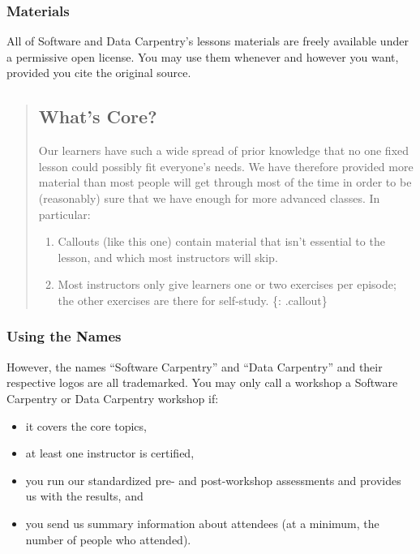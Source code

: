 \subsubsection{Materials}\label{materials}

All of Software and Data Carpentry's lessons materials are freely
available under a permissive open license. You may use
them whenever and however you want, provided you cite the original
source.

\begin{quote}
\subsection{What's Core?}\label{whats-core}

Our learners have such a wide spread of prior knowledge that no one
fixed lesson could possibly fit everyone's needs. We have therefore
provided more material than most people will get through most of the
time in order to be (reasonably) sure that we have enough for more
advanced classes. In particular:

\begin{enumerate}
\def\labelenumi{\arabic{enumi}.}
\itemsep1pt\parskip0pt
\item
  Callouts (like this one) contain material that isn't essential to the
  lesson, and which most instructors will skip.
\item
  Most instructors only give learners one or two exercises per episode;
  the other exercises are there for self-study. \{: .callout\}
\end{enumerate}
\end{quote}

\subsubsection{Using the Names}\label{using-the-names}

However, the names ``Software Carpentry'' and ``Data Carpentry'' and
their respective logos are all trademarked. You may only call a workshop
a Software Carpentry or Data Carpentry workshop if:

\begin{itemize}
\itemsep1pt\parskip0pt
\item
  it covers the core topics,
\item
  at least one instructor is certified,
\item
  you run our standardized pre- and post-workshop assessments and
  provides us with the results, and
\item
  you send us summary information about attendees (at a minimum, the
  number of people who attended).
\end{itemize}

